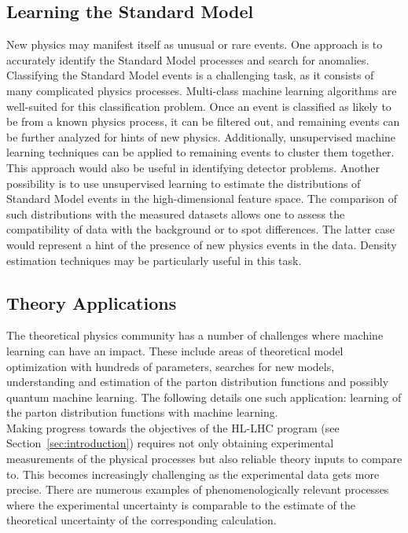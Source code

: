 \subsection{Learning the Standard Model}

New physics may manifest itself as unusual or rare events. One approach is to accurately identify the Standard Model processes and search for anomalies. Classifying the Standard Model events is a challenging task, as it consists of many complicated physics processes. Multi-class machine learning algorithms are well-suited for this classification problem. Once an event is classified as likely to be from a known physics process, it can be filtered out, and remaining events can be further analyzed for hints of new physics. Additionally, unsupervised machine learning techniques can be applied to remaining events to cluster them together. This approach would also be useful in identifying detector problems.
Another possibility is to use unsupervised learning to estimate the distributions of Standard Model events in the high-dimensional feature space. The comparison of such distributions with the measured datasets allows one to assess the compatibility of data with the background or to spot differences. The latter case would represent a hint of the presence of new physics events in the data. Density estimation techniques may be particularly useful in this task.

\subsection{Theory Applications}

The theoretical physics community has a number of challenges where machine learning can have an impact. These include areas of theoretical model optimization with hundreds of parameters, searches for new models,  understanding and estimation of the parton distribution functions and possibly quantum machine learning. The following details one such application: learning of the parton distribution functions with machine learning.\\

Making progress towards the objectives of the HL-LHC program (see Section~\ref{sec:introduction}) requires not only
obtaining experimental measurements of the physical processes but also reliable theory inputs to compare to. This becomes increasingly challenging as the experimental data gets more precise. There are numerous examples of phenomenologically relevant processes where the experimental uncertainty is comparable to the estimate of the theoretical uncertainty of the corresponding calculation.\\

